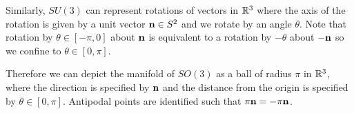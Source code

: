 Similarly, $SU \left( 3 \right) $ can represent rotations of vectors in $\mathbb{R}^{3}$ where the axis of the rotation is given by a unit vector $\vb{n} \in S^2$ and we rotate by an angle $\theta$. Note that rotation by $\theta \in \left[ -\pi,0 \right] $ about $\vb{n}$ is equivalent to a rotation by $- \theta$ about $-\vb{n}$ so we confine to $\theta \in \left[ 0,\pi \right] $.

Therefore we can depict the manifold of $SO \left( 3 \right) $ as a ball of radius $\pi$ in $\mathbb{R}^{3}$, where the direction is specified by $\vb{n}$ and the distance from the origin is specified by $\theta \in \left[ 0,\pi \right] $. Antipodal points are identified such that $\pi \vb{n} = - \pi \vb{n}$.

